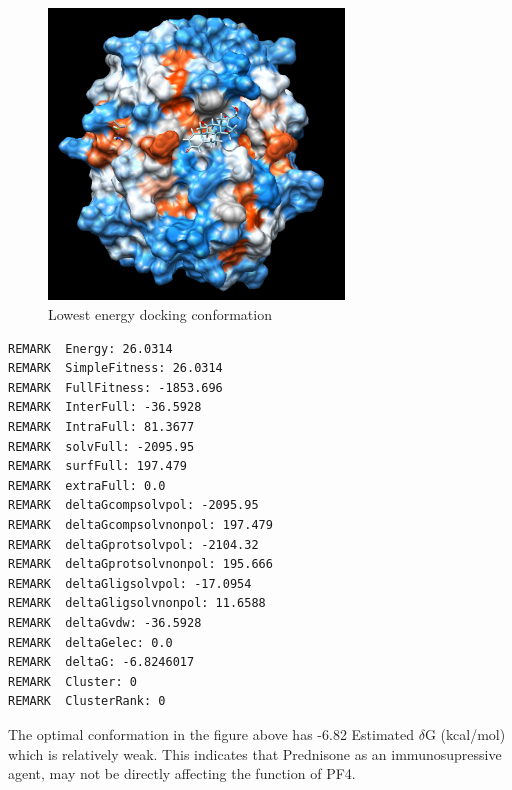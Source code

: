 \begin{figure}[H]
    \centering
    \includegraphics[width=0.7\textwidth]{image/DOCK2.png}
    \caption{Lowest energy docking conformation}
    \label{HMCD3}
\end{figure}

\begin{lstlisting}
REMARK  Energy: 26.0314
REMARK  SimpleFitness: 26.0314
REMARK  FullFitness: -1853.696
REMARK  InterFull: -36.5928
REMARK  IntraFull: 81.3677
REMARK  solvFull: -2095.95
REMARK  surfFull: 197.479
REMARK  extraFull: 0.0
REMARK  deltaGcompsolvpol: -2095.95
REMARK  deltaGcompsolvnonpol: 197.479
REMARK  deltaGprotsolvpol: -2104.32
REMARK  deltaGprotsolvnonpol: 195.666
REMARK  deltaGligsolvpol: -17.0954
REMARK  deltaGligsolvnonpol: 11.6588
REMARK  deltaGvdw: -36.5928
REMARK  deltaGelec: 0.0
REMARK  deltaG: -6.8246017
REMARK  Cluster: 0
REMARK  ClusterRank: 0

\end{lstlisting}

The optimal conformation in the figure above has -6.82 Estimated $\delta$G (kcal/mol) which is relatively weak. This indicates that Prednisone as an immunosupressive agent, may not be directly affecting the function of PF4.
